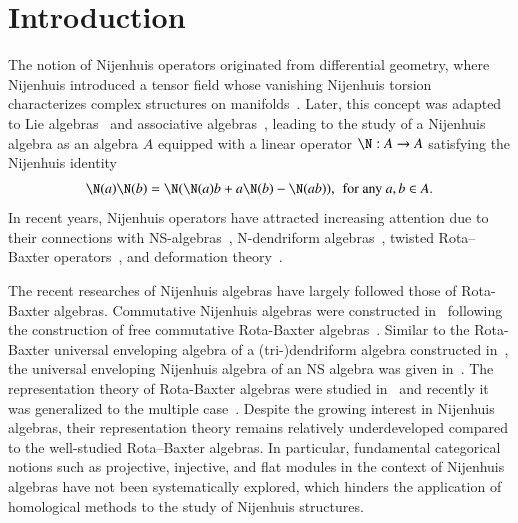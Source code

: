 \documentclass[12pt]{amsart}
\theoremstyle{definition}
\begin{document}
\section{Introduction}
The notion of Nijenhuis operators originated from differential geometry, where Nijenhuis introduced a tensor field whose vanishing Nijenhuis torsion characterizes complex structures on manifolds~. Later, this concept was adapted to Lie algebras~ and associative algebras~, leading to the study of a Nijenhuis algebra as an algebra $A$ equipped with a linear operator $\N: A \to A$ satisfying the Nijenhuis identity
\begin{align*}
\N(a) \N(b)=\N (\N(a)b+a\N(b)-\N(ab)), \, \text{ for any } a, b \in A.
\end{align*}
 In recent years, Nijenhuis operators have attracted increasing attention due to their connections with NS-algebras~, N-dendriform algebras~, twisted Rota–Baxter operators~, and deformation theory~.

The recent researches of Nijenhuis algebras have largely followed those of Rota-Baxter algebras. Commutative Nijenhuis algebras were
constructed in~ following the construction of free commutative Rota-Baxter
algebras~. Similar to the Rota-Baxter universal enveloping algebra of a (tri-)dendriform algebra constructed in~, the universal enveloping Nijenhuis algebra of an NS algebra was given in~. The representation theory of Rota-Baxter algebras were studied in~ and recently it was generalized to the multiple case~. Despite the growing interest in Nijenhuis algebras, their representation theory remains relatively underdeveloped compared to the well-studied Rota–Baxter algebras. In particular, fundamental categorical notions such as projective, injective, and flat modules in the context of Nijenhuis algebras have not been systematically explored, which hinders the application of homological methods to the study of Nijenhuis structures.
\end{document}
